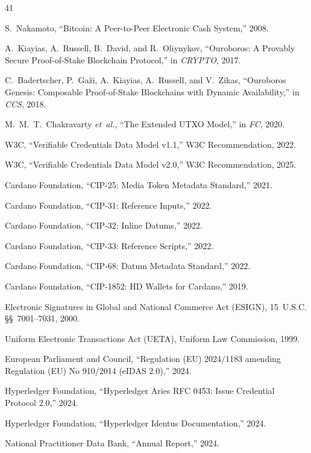 \documentclass[conference,10pt]{IEEEtran}
\begin{document}
\begin{thebibliography}{41}

S.~Nakamoto, ``Bitcoin: A Peer-to-Peer Electronic Cash System,'' 2008.

A.~Kiayias, A.~Russell, B.~David, and R.~Oliynykov, ``Ouroboros: A Provably Secure Proof-of-Stake Blockchain Protocol,'' in \emph{CRYPTO}, 2017.

C.~Badertscher, P.~Ga\v{z}i, A.~Kiayias, A.~Russell, and V.~Zikas, ``Ouroboros Genesis: Composable Proof-of-Stake Blockchains with Dynamic Availability,'' in \emph{CCS}, 2018.

M.~M.~T.~Chakravarty \emph{et~al.}, ``The Extended UTXO Model,'' in \emph{FC}, 2020.

W3C, ``Verifiable Credentials Data Model v1.1,'' W3C Recommendation, 2022.

W3C, ``Verifiable Credentials Data Model v2.0,'' W3C Recommendation, 2025.

Cardano Foundation, ``CIP-25: Media Token Metadata Standard,'' 2021.

Cardano Foundation, ``CIP-31: Reference Inputs,'' 2022.

Cardano Foundation, ``CIP-32: Inline Datums,'' 2022.

Cardano Foundation, ``CIP-33: Reference Scripts,'' 2022.

Cardano Foundation, ``CIP-68: Datum Metadata Standard,'' 2022.

Cardano Foundation, ``CIP-1852: HD Wallets for Cardano,'' 2019.

Electronic Signatures in Global and National Commerce Act (ESIGN), 15~U.S.C. \S\S~7001--7031, 2000.

Uniform Electronic Transactions Act (UETA), Uniform Law Commission, 1999.

European Parliament and Council, ``Regulation (EU) 2024/1183 amending Regulation (EU) No 910/2014 (eIDAS 2.0),'' 2024.

Hyperledger Foundation, ``Hyperledger Aries RFC 0453: Issue Credential Protocol 2.0,'' 2024.

Hyperledger Foundation, ``Hyperledger Identus Documentation,'' 2024.

National Practitioner Data Bank, ``Annual Report,'' 2024.


\end{thebibliography}
\end{document}
